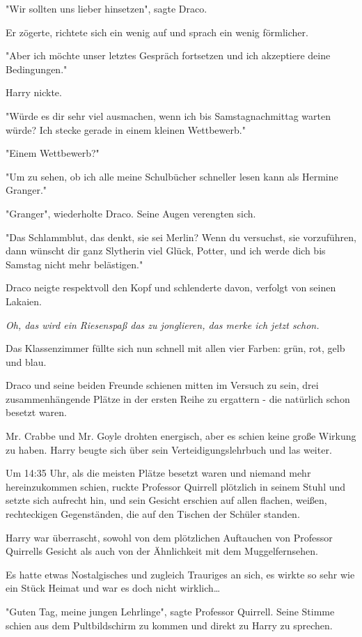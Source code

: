 {"Wir sollten uns lieber hinsetzen", sagte Draco.

Er zögerte, richtete sich ein wenig auf und sprach ein wenig förmlicher.

"Aber ich möchte unser letztes Gespräch fortsetzen und ich akzeptiere deine Bedingungen."

Harry nickte.

"Würde es dir sehr viel ausmachen, wenn ich bis Samstagnachmittag warten würde? Ich stecke gerade in einem kleinen Wettbewerb."

"Einem Wettbewerb?"

"Um zu sehen, ob ich alle meine Schulbücher schneller lesen kann als Hermine Granger."

"Granger", wiederholte Draco. Seine Augen verengten sich.

"Das Schlammblut, das denkt, sie sei Merlin? Wenn du versuchst, sie vorzuführen, dann wünscht dir ganz Slytherin viel Glück, Potter, und ich werde dich bis Samstag nicht mehr belästigen."

Draco neigte respektvoll den Kopf und schlenderte davon, verfolgt von seinen Lakaien.

\emph{Oh, das wird ein Riesenspaß das zu jonglieren, das merke ich jetzt schon.}

Das Klassenzimmer füllte sich nun schnell mit allen vier Farben: grün, rot, gelb und blau.

Draco und seine beiden Freunde schienen mitten im Versuch zu sein, drei zusammenhängende Plätze in der ersten Reihe zu ergattern - die natürlich schon besetzt waren.

Mr. Crabbe und Mr. Goyle drohten energisch, aber es schien keine große Wirkung zu haben. Harry beugte sich über sein Verteidigungslehrbuch und las weiter.

Um 14:35 Uhr, als die meisten Plätze besetzt waren und niemand mehr hereinzukommen schien, ruckte Professor Quirrell plötzlich in seinem Stuhl und setzte sich aufrecht hin, und sein Gesicht erschien auf allen flachen, weißen, rechteckigen Gegenständen, die auf den Tischen der Schüler standen.

Harry war überrascht, sowohl von dem plötzlichen Auftauchen von Professor Quirrells Gesicht als auch von der Ähnlichkeit mit dem Muggelfernsehen.

Es hatte etwas Nostalgisches und zugleich Trauriges an sich, es wirkte so sehr wie ein Stück Heimat und war es doch nicht wirklich…

"Guten Tag, meine jungen Lehrlinge", sagte Professor Quirrell. Seine Stimme schien aus dem Pultbildschirm zu kommen und direkt zu Harry zu sprechen.

}

